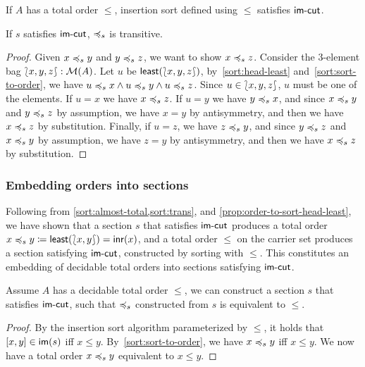 \begin{proposition}
    \label{prop:order-to-sort-head-least}
    If $A$ has a total order $\leq$,
    insertion sort defined using $\leq$ satisfies $\operatorname{\mathsf{im-cut}}$.
\end{proposition}

\begin{proposition}
    \label{sort:trans}
    If $s$ satisfies $\operatorname{\mathsf{im-cut}}$, $\preccurlyeq_{s}$ is transitive.
\end{proposition}
\begin{proof}
    Given $x \preccurlyeq_{s} y$ and $y \preccurlyeq_{s} z$, we want to show $x \preccurlyeq_{s} z$.
    Consider the 3-element bag ${\lbag}{x,y,z}{\rbag} : \mathcal{M}(A)$.
    Let $u$ be $\operatorname{\mathsf{least}}({\lbag}{x,y,z}{\rbag})$,
    by~\cref{sort:head-least} and~\cref{sort:sort-to-order},
    we have $u \preccurlyeq_{s} x \land u \preccurlyeq_{s} y \land u \preccurlyeq_{s} z$.
    Since $u \in {\lbag}{x,y,z}{\rbag}$, $u$ must be one of the elements.
    If $u = x$ we have $x \preccurlyeq_{s} z$.
    If $u = y$ we have $y \preccurlyeq_{s} x$,
    and since $x \preccurlyeq_{s} y$ and $y \preccurlyeq_{s} z$ by assumption,
    we have $x = y$ by antisymmetry, and then we have $x \preccurlyeq_{s} z$ by substitution.
    Finally, if $u = z$, we have $z \preccurlyeq_{s} y$, and since $y \preccurlyeq_{s} z$ and $x \preccurlyeq_{s} y$ by assumption,
    we have $z = y$ by antisymmetry, and then we have $x \preccurlyeq_{s} z$ by substitution.
\end{proof}

\subsubsection{Embedding orders into sections}

Following from \cref{sort:almost-total,sort:trans},
and \cref{prop:order-to-sort-head-least},
we have shown that a section $s$ that satisfies $\operatorname{\mathsf{im-cut}}$ produces a total order
$x \leqs y \defeq \term{least}(\bag{x, y}) \id \inr(x)$,
and a total order $\leq$ on the carrier set produces a section satisfying $\operatorname{\mathsf{im-cut}}$,
constructed by sorting with $\leq$.
%
This constitutes an embedding of decidable total orders into sections satisfying $\operatorname{\mathsf{im-cut}}$.

\begin{proposition}\label{sort:o2s2o}
    Assume $A$ has a decidable total order $\leq$, we can construct a section $s$ that
    satisfies $\operatorname{\mathsf{im-cut}}$, such that $\preccurlyeq_{s}$ constructed from $s$ is equivalent
    to $\leq$.
\end{proposition}
\begin{proof}
    By the insertion sort algorithm parameterized by $\leq$,
    it holds that $\inimage{[x, y]}$ iff $x \leq y$.
    By~\cref{sort:sort-to-order}, we have $x \preccurlyeq_{s} y$ iff $x \leq y$.
    We now have a total order $x \preccurlyeq_{s} y$ equivalent to $x \leq y$.
\end{proof}

